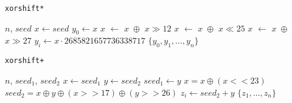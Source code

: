 \documentclass[%
floatfix,
showkeys,
nofootinbib, %
superscriptaddress, %
]{revtex4-1}
\begin{document}
\begin{minipage}[t]{0.5\textwidth}
        \vspace{-10pt}
        \begin{algorithm}[H]
                \begin{algorithmic}
                        \caption{\texttt{xorshift*}}\label{alg:xorshift64star}
                        \Require $n$, $seed$
                        \State $x \leftarrow seed$
                        \State $y_{0} \leftarrow x$
                                \State $x$ $\leftarrow$ $x\; \oplus$ $x \gg 12$
                                \State $x$ $\leftarrow$ $x\; \oplus$ $x \ll 25$
                                \State $x$ $\leftarrow$ $x\; \oplus$ $x \gg 27$
                                \State $y_{i} \leftarrow  x \cdot 2685821657736338717$ 
                        \EndFor
                        \State \Return $\{y_{0}, y_{1}, \ldots, y_{n}\}$
                \end{algorithmic}
        \end{algorithm}
\end{minipage}
\begin{minipage}[t]{0.5\textwidth}
        \vspace{-10pt}
        \begin{algorithm}[H]
                \caption{\texttt{xorshift+}}\label{alg:xorshift128plus}
                \begin{algorithmic}
                        \Require $n$, $seed_{1}$, $seed_{2}$
                                \State $x \leftarrow seed_{1}$
                                \State $y \leftarrow seed_{2}$
                                \State $seed_{1} \leftarrow y$
                                \State $x = x \oplus (x << 23)$
                                \State $seed_{2} = x \oplus y \oplus (x >> 17) \oplus (y >> 26)$
                                \State $z_{i} \leftarrow seed_{2} + y$
                        \EndFor
                        \State \Return $\{z_{1},\ldots,z_{n}\}$
                \end{algorithmic}
        \end{algorithm}
\end{minipage}
\end{document}

